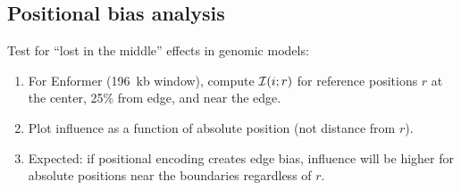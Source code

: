 \subsection{Positional bias analysis}

Test for ``lost in the middle'' effects in genomic models:
\begin{enumerate}[leftmargin=2em, label=(\roman*)]
\item For Enformer (196~kb window), compute $\mathcal{I}(i;r)$ for reference positions $r$ at the center, 25\% from edge, and near the edge.
\item Plot influence as a function of absolute position (not distance from $r$).
\item Expected: if positional encoding creates edge bias, influence will be higher for absolute positions near the boundaries regardless of $r$.
\end{enumerate}
